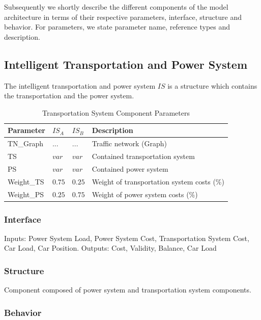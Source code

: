 Subsequently we shortly describe the different components of the model architecture in terms of their respective parameters, interface, structure and behavior. For parameters, we state parameter name, reference types and description.

\subsection{Intelligent Transportation and Power System}

The intelligent transportation and power system $IS$ is a structure which contains the transportation and the power system.

\begin{table}[h]
	\renewcommand{\arraystretch}{1.3}
	\caption{Transportation System Component Parameters}
	\centering
	\begin{tabular}{llll}
		\hline
		\textbf{Parameter}     & \textbf{$IS_{A}$} & \textbf{$IS_{B}$}       & \textbf{Description} \\ \hline
		TN\_Graph               & $...$ & $...$  	  & Traffic network (Graph)     \\
		TS     & $var$   & $var$ 	  & Contained transportation system     \\
		PS               & $var$ 	 & $var$ & Contained power system    \\
		Weight\_TS               & $0.75$  & $0.25$ & Weight of transportation system costs (\%)       \\ 
		Weight\_PS               & $0.25$  & $0.75$  		  & Weight of power system costs (\%)   \\ \hline
	\end{tabular}
\end{table}

\subsubsection{Interface}

Inputs: Power System Load, Power System Cost, Transportation System Cost, Car Load, Car Position. Outputs: Cost, Validity, Balance, Car Load

\subsubsection{Structure}

Component composed of power system and transportation system components.

\subsubsection{Behavior}

